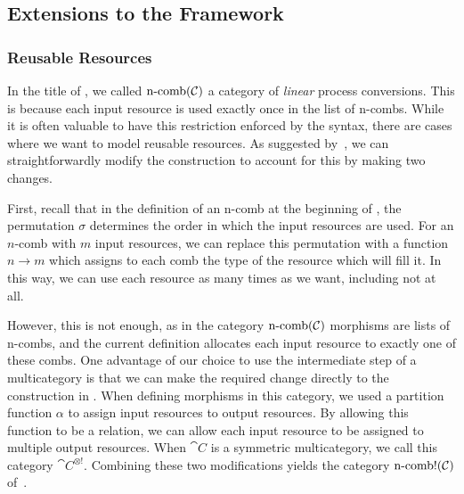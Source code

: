 \subsection{Extensions to the Framework}

\subsubsection{Reusable Resources}
In the title of
,
we called $\operatorname*{n-comb}({\mathcal{C}})$ a category of \emph{linear} process conversions.
This is because each input resource is used exactly once in the list of n-combs.
While it is often valuable to have this restriction enforced by the syntax,
there are cases where we want to model reusable resources. As suggested
by~\cite{broadbent-karvonen-2022}, we can straightforwardly modify the
construction to account for this by making two changes.

First, recall that in the definition of an n-comb at the beginning of
,
the permutation $\sigma$ determines the order in which the input resources are
used. For an $n$-comb with $m$ input resources, we can replace this permutation
with a function $n\to m$ which assigns to each comb the type of the resource
which will fill it. In this way, we can use each resource as many times
as we want, including not at all.

However, this is not enough, as in the category $\operatorname*{n-comb}({\mathcal{C}})$ morphisms are
lists of n-combs, and the current definition allocates each input resource to
exactly one of these combs. One advantage of our choice to use the intermediate
step of a multicategory is that we can make the required change directly to the
construction in . When
defining morphisms in this category, we used a partition function $\alpha$ to
assign input resources to output resources. By allowing this function to be a
relation, we can allow each input resource to be assigned to multiple output
resources. When $\cat{C}$ is a symmetric multicategory, we call this category
$\cat{C}^{\otimes!}$. Combining these two modifications yields the category
$\operatorname*{n-comb!}({\mathcal{C}})$ of~\cite{broadbent-karvonen-2022}.

